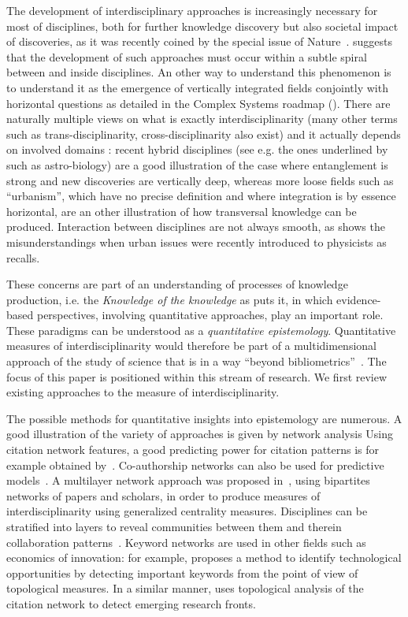 The development of interdisciplinary approaches is increasingly necessary for most of disciplines, both for further knowledge discovery but also societal impact of discoveries, as it was recently coined by the special issue of Nature~\citep{natureInterdisc}. \cite{banos2013pour} suggests that the development of such approaches must occur within a subtle spiral between and inside disciplines. An other way to understand this phenomenon is to understand it as the emergence of vertically integrated fields conjointly with horizontal questions as detailed in the Complex Systems roadmap (\cite{2009arXiv0907.2221B}). There are naturally multiple views on what is exactly interdisciplinarity (many other terms such as trans-disciplinarity, cross-disciplinarity also exist) and it actually depends on involved domains : recent hybrid disciplines (see e.g. the ones underlined  by \cite{bais2010praise} such as astro-biology) are a good illustration of the case where entanglement is strong and new discoveries are vertically deep, whereas more loose fields such as ``urbanism'', which have no precise definition and where integration is by essence horizontal, are an other illustration of how transversal knowledge can be produced. Interaction between disciplines are not always smooth, as shows the misunderstandings when urban issues were recently introduced to physicists as \cite{dupuy2015sciences} recalls.


These concerns are part of an understanding of processes of knowledge production, i.e. the \emph{Knowledge of the knowledge} as \cite{morin1986methode} puts it, in which evidence-based perspectives, involving quantitative approaches, play an important role. These paradigms can be understood as a \emph{quantitative epistemology}. Quantitative measures of interdisciplinarity would therefore be part of a multidimensional approach of the study of science that is in a way ``beyond bibliometrics''~\citep{cronin2014beyond}. The focus of this paper is positioned within this stream of research. We first review existing approaches to the measure of interdisciplinarity.


The possible methods for quantitative insights into epistemology are numerous. A good illustration of the variety of approaches is given by network analysis Using citation network features, a good predicting power for citation patterns is for example obtained by~\cite{2013arXiv1310.8220N}. Co-authorship networks can also be used for predictive models~\citep{2014arXiv1402.7268S}. A multilayer network approach was proposed in~\cite{omodei2017evaluating}, using bipartites networks of papers and scholars, in order to produce measures of interdisciplinarity using generalized centrality measures. Disciplines can be stratified into layers to reveal communities between them and therein collaboration patterns~\citep{2015arXiv150601280B}. Keyword networks are used in other fields such as economics of innovation: for example, \cite{choi2014patent} proposes a method to identify technological opportunities by detecting important keywords from the point of view of topological measures. In a similar manner, \cite{shibata2008detecting} uses topological analysis of the citation network to detect emerging research fronts.



